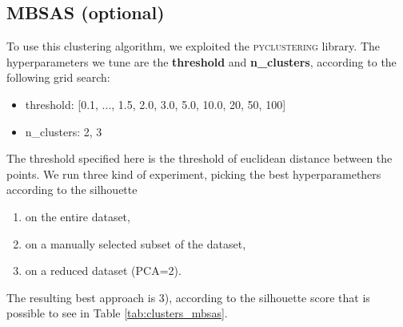 \documentclass[12pt]{article}
\begin{document}
\subsection{MBSAS (optional)}
To use this clustering algorithm, we exploited the \textsc{pyclustering} library. 
The hyperparameters we tune are the \textbf{threshold} and \textbf{n\_clusters}, according to the following grid search:
\begin{itemize}
    \item threshold: [0.1, ..., 1.5, 2.0, 3.0, 5.0, 10.0, 20, 50, 100]
    \item n\_clusters: {2, 3}
\end{itemize}
The threshold specified here is the threshold of euclidean distance between the points.
We run three kind of experiment, picking the best hyperparamethers according to the silhouette
\begin{enumerate}
    \item on the entire dataset,
    \item on a manually selected subset of the dataset,
    \item on a reduced dataset (PCA=2).
\end{enumerate}

The resulting best approach is 3), according to the silhouette score that is possible to see in Table \ref{tab:clusters_mbsas}.
\end{document}
